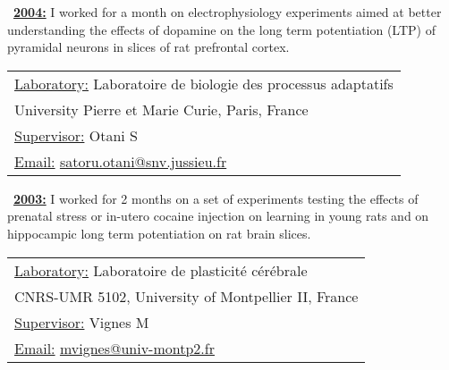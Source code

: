\documentclass[a4paper,12pt,oneside]{letter}
\begin{document}
{\begin{minipage}[c]{6.7cm}
\textbullet~\underline{\textbf{2004:}}	I worked for a month on electrophysiology experiments aimed at better understanding the effects of dopamine on the long term potentiation (LTP) of pyramidal neurons in slices of rat prefrontal cortex.
\end{minipage}
\hspace{3mm}
\begin{minipage}[c]{\textwidth}
\setlength\minrowclearance{0.1cm}
\setlength\arrayrulewidth{1.5pt}
\small
\begin{tabular}[c]{|l|}\hline
\underline{Laboratory:} Laboratoire de biologie des processus adaptatifs\\
University Pierre et Marie Curie, Paris, France\\
\underline{Supervisor:} Otani S\\
\underline{Email:} \href{mailto:satoru.otani@snv.jussieu.fr}{satoru.otani@snv.jussieu.fr}\\ \hline
\end{tabular}
\end{minipage}

\begin{minipage}[c]{7.7cm}
\textbullet~\underline{\textbf{2003:}}	I worked for 2 months on a set of experiments testing the effects of prenatal stress or in-utero cocaine injection on learning in young rats and on hippocampic long term potentiation on rat brain slices.
\end{minipage}
\hspace{3mm}
\begin{minipage}[c]{\textwidth}
\setlength\minrowclearance{0.1cm}
\setlength\arrayrulewidth{1.5pt}
\small
\begin{tabular}[c]{|l|}\hline
\underline{Laboratory:} Laboratoire de plasticité cérébrale\\
CNRS-UMR 5102, University of Montpellier II, France\\
\underline{Supervisor:} Vignes M\\
\underline{Email:} \href{mailto:mvignes@univ-montp2.fr}{mvignes@univ-montp2.fr}\\ \hline
\end{tabular}
\end{minipage}
 

}
\end{document}
